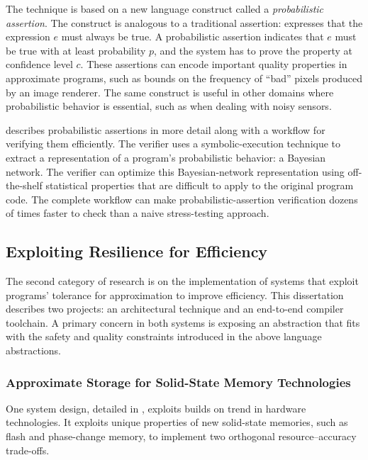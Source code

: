 The technique is based on a new language construct called a
\emph{probabilistic assertion}.
The construct is analogous to a traditional assertion: 
expresses that the expression $e$ must always be true.
A probabilistic assertion  indicates that $e$ must
be true with at least probability $p$, and the system has to prove the
property at confidence level $c$.
These assertions can encode important quality properties in approximate
programs, such as bounds on the frequency of ``bad'' pixels produced by an
image renderer.
The same construct is useful in other domains where probabilistic behavior is
essential, such as when dealing with noisy sensors.

 describes probabilistic assertions in more detail
along with a workflow for verifying them efficiently.
The verifier uses a symbolic-execution technique to extract a representation
of a program's probabilistic behavior: a Bayesian network.
The verifier can optimize this Bayesian-network representation using
off-the-shelf statistical properties that are difficult to apply to the
original program code.
The complete workflow can make probabilistic-assertion verification dozens of
times faster to check than a naive stress-testing approach.

\subsection{Exploiting Resilience for Efficiency}

The second category of research is on the implementation of systems that
exploit programs' tolerance for approximation to improve efficiency.
This dissertation describes two projects: an architectural technique and an
end-to-end compiler toolchain.
A primary concern in both systems is exposing an abstraction that fits with
the safety and quality constraints introduced in the above language
abstractions.

\subsubsection{Approximate Storage for Solid-State Memory Technologies}

One system design, detailed in , exploits builds on trend in hardware technologies.
It exploits unique properties of new solid-state memories,
such as flash and phase-change memory,
to implement two orthogonal resource--accuracy trade-offs.

